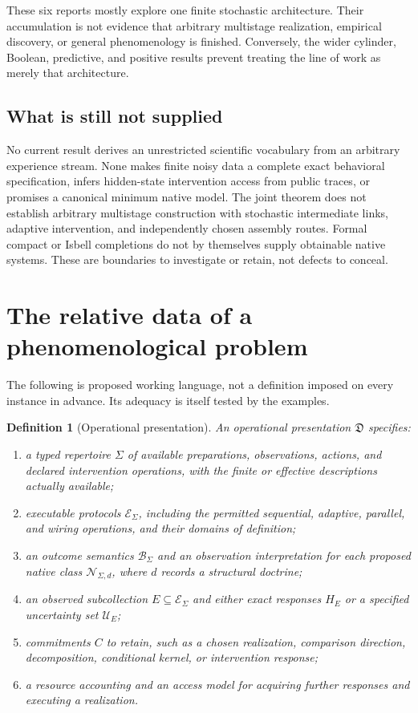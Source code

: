 \documentclass[11pt]{article}
\newtheorem{definition}{Definition}[section]
\theoremstyle{remark}
\newcommand{\calE}{\mathcal E}
\newcommand{\calN}{\mathcal N}
\newcommand{\calB}{\mathcal B}
\newcommand{\calU}{\mathcal U}
\begin{document}
These six reports mostly explore one finite stochastic architecture. Their accumulation is not evidence that arbitrary multistage realization, empirical discovery, or general phenomenology is finished. Conversely, the wider cylinder, Boolean, predictive, and positive results prevent treating the line of work as merely that architecture.

\subsection{What is still not supplied}

No current result derives an unrestricted scientific vocabulary from an arbitrary experience stream. None makes finite noisy data a complete exact behavioral specification, infers hidden-state intervention access from public traces, or promises a canonical minimum native model. The joint theorem does not establish arbitrary multistage construction with stochastic intermediate links, adaptive intervention, and independently chosen assembly routes. Formal compact or Isbell completions do not by themselves supply obtainable native systems. These are boundaries to investigate or retain, not defects to conceal.

\section{The relative data of a phenomenological problem}
\label{sec:data}

The following is proposed working language, not a definition imposed on every instance in advance. Its adequacy is itself tested by the examples.

\begin{definition}[Operational presentation]
An operational presentation $\mathfrak D$ specifies:
\begin{enumerate}
\item a typed repertoire $\Sigma$ of available preparations, observations, actions, and declared intervention operations, with the finite or effective descriptions actually available;
\item executable protocols $\calE_\Sigma$, including the permitted sequential, adaptive, parallel, and wiring operations, and their domains of definition;
\item an outcome semantics $\calB_\Sigma$ and an observation interpretation for each proposed native class $\calN_{\Sigma,d}$, where $d$ records a structural doctrine;
\item an observed subcollection $E\subseteq\calE_\Sigma$ and either exact responses $H_E$ or a specified uncertainty set $\calU_E$;
\item commitments $C$ to retain, such as a chosen realization, comparison direction, decomposition, conditional kernel, or intervention response;
\item a resource accounting and an access model for acquiring further responses and executing a realization.
\end{enumerate}
\end{definition}
\end{document}
